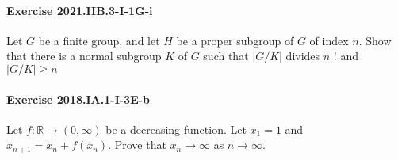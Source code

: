 \documentclass{article}
\begin{document}
\paragraph{Exercise 2021.IIB.3-I-1G-i} Let $G$ be a finite group, and let $H$ be a proper subgroup of $G$ of index $n$. Show that there is a normal subgroup $K$ of $G$ such that $|G / K|$ divides $n$ ! and $|G / K| \geqslant n$

\paragraph{Exercise 2018.IA.1-I-3E-b} Let $f: \mathbb{R} \rightarrow(0, \infty)$ be a decreasing function. Let $x_{1}=1$ and $x_{n+1}=x_{n}+f\left(x_{n}\right)$. Prove that $x_{n} \rightarrow \infty$ as $n \rightarrow \infty$.
\end{document}
